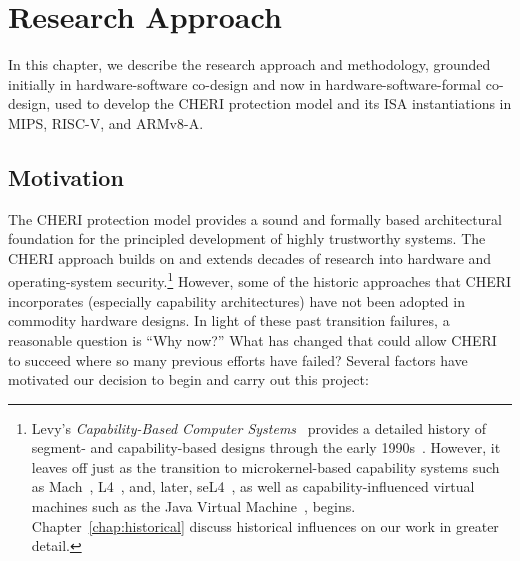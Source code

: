 \chapter{Research Approach}
\label{chap:research}

In this chapter, we describe the research approach and methodology, grounded
initially in hardware-software co-design and now in
hardware-software-formal co-design, used to develop the CHERI protection model and its ISA instantiations in MIPS, RISC-V, and ARMv8-A.

\section{Motivation}

The CHERI protection model provides a sound and formally based architectural
foundation for the principled development of highly
trustworthy systems.
The CHERI approach builds on and extends decades of research into hardware and 
operating-system security.\footnote{Levy's {\em Capability-Based Computer Systems}~\cite{levy:capabilities} provides a
detailed history of segment- and capability-based designs through the early
1990s~\cite{levy:capabilities}.
However, it leaves off just as the transition to microkernel-based capability systems such as
Mach~\cite{accetta:mach}, L4~\cite{liedtke:l4}, and, later, seL4~\cite{klein:sel4}, as
well as capability-influenced virtual machines such as the Java Virtual Machine~\cite{Gong99},
begins.
Chapter~\ref{chap:historical} discuss historical influences on our work in greater detail.}
However, some of the historic approaches that CHERI incorporates (especially capability architectures) 
have not been adopted in commodity hardware designs.
In light of these past transition failures, a reasonable question 
is ``Why now?''
What has changed that could allow CHERI to succeed where 
so many previous efforts have failed?
Several factors have motivated our decision to begin and carry out this project:

